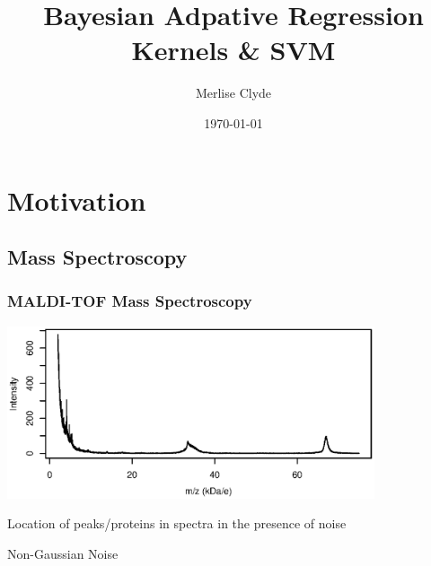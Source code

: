 \documentclass[handout]{beamer}
\title{Bayesian Adpative Regression Kernels \& SVM}
\author[M. Clyde]{Merlise Clyde}
\institute{Department of Statistical Science \\ Duke
University }
\date{\today}
\newcommand{\bs}[2]{\begin{frame} \frametitle{#1}
{#2}
\end{frame} }
\begin{document}
\begin{frame}
  \titlepage
\end{frame}

\section{Motivation}

\subsection{Mass Spectroscopy}
\bs{MALDI-TOF Mass Spectroscopy} {
\centerline{  \includegraphics[height=2in]{mean-spectrum.ps}}

Location of peaks/proteins in spectra  in the presence of noise

Non-Gaussian  Noise
}
\end{document}
